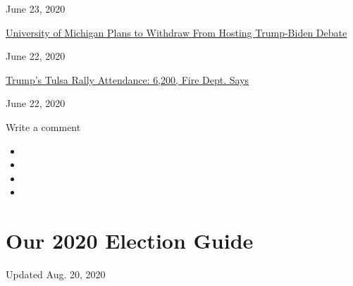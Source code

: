 June 23, 2020

\href{https://www.nytimes3xbfgragh.onion/2020/06/22/us/politics/trump-vs-biden-presidential-debates.html}{University
of Michigan Plans to Withdraw From Hosting Trump-Biden Debate}

June 22, 2020

\href{https://www.nytimes3xbfgragh.onion/2020/06/22/us/politics/trump-rally-coronavirus.html}{Trump's
Tulsa Rally Attendance: 6,200, Fire Dept. Says}

June 22, 2020

Write a comment

\begin{itemize}
\item
\item
\item
\item
\end{itemize}

\hypertarget{our-2020-election-guide}{%
\section{Our 2020 Election Guide}\label{our-2020-election-guide}}

Updated Aug. 20, 2020

